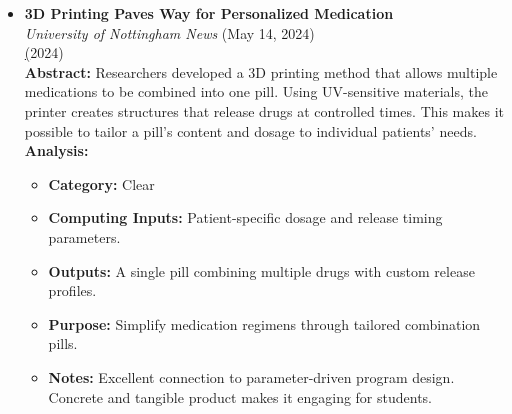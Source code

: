 \documentclass[11pt]{article}
\begin{document}
\begin{itemize}
\item \textbf{3D Printing Paves Way for Personalized Medication} \\
\textit{University of Nottingham News} (May 14, 2024)\\
\href{https://technews.acm.org/archives.cfm?fo=2024-05-may#17} (2024)\\
\textbf{Abstract:} Researchers developed a 3D printing method that allows multiple medications to be combined into one pill. Using UV-sensitive materials, the printer creates structures that release drugs at controlled times. This makes it possible to tailor a pill's content and dosage to individual patients’ needs.\\
\textbf{Analysis:}\\
\begin{itemize}
\item \textbf{Category:} Clear
\item \textbf{Computing Inputs:} Patient-specific dosage and release timing parameters.
\item \textbf{Outputs:} A single pill combining multiple drugs with custom release profiles.
\item \textbf{Purpose:} Simplify medication regimens through tailored combination pills.
\item \textbf{Notes:} Excellent connection to parameter-driven program design. Concrete and tangible product makes it engaging for students.
\end{itemize}


\end{itemize}
\end{document}
